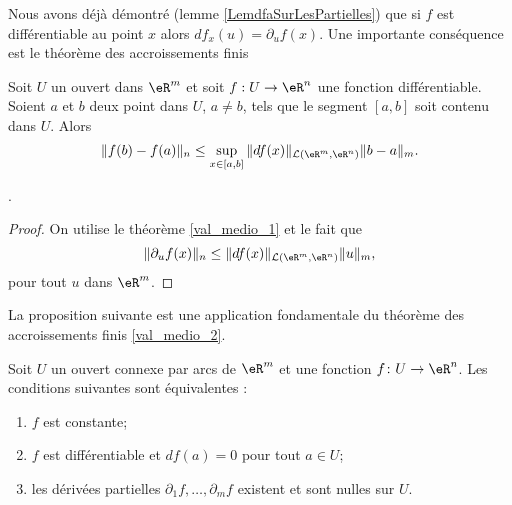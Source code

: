 Nous avons déjà démontré (lemme \ref{LemdfaSurLesPartielles}) que si $f$ est différentiable au point $x$ alors  $df_x(u)=\partial_uf(x)$. Une importante conséquence est le théorème des accroissements finis
\begin{theorem}\label{val_medio_2}
   Soit $U$ un ouvert dans $\eR^m$ et soit $f:U\to\eR^n$ une fonction différentiable. Soient $a$ et $b$ deux point dans $U$, $a\neq b$, tels que le segment $[a,b]$ soit contenu dans $U$. Alors
\[
\|f(b)-f(a)\|_n\leq \sup_{x\in[a,b]}\|df(x)\|_{\mathcal{L}(\eR^m,\eR^n)}\|b-a\|_m.
\]
\end{theorem}
.

\begin{proof}
 On utilise le théorème \ref{val_medio_1} et le fait que 
\[
\|\partial_u f(x)\|_n\leq \|df(x)\|_{\mathcal{L}(\eR^m,\eR^n)}\|u\|_m,
\]
pour tout $u$ dans $\eR^m$.
\end{proof}

La proposition suivante est une application fondamentale du théorème des accroissements finis \ref{val_medio_2}.
\begin{proposition}		\label{PropAnnulationEtConstance}
	Soit $U$ un ouvert connexe par arcs de $\eR^m$ et une fonction $f\colon U\to \eR^n$. Les conditions suivantes sont équivalentes :
	\begin{enumerate}
		\item\label{ItemPropCstDiffZeroi}
			$f$ est constante;
		\item\label{ItemPropCstDiffZeroii}
			$f$ est différentiable et $df(a)=0$ pour tout $a\in U$;
		\item\label{ItemPropCstDiffZeroiii}
			les dérivées partielles $\partial_1f,\ldots,\partial_mf$ existent et sont nulles sur $U$.
	\end{enumerate}
\end{proposition}

